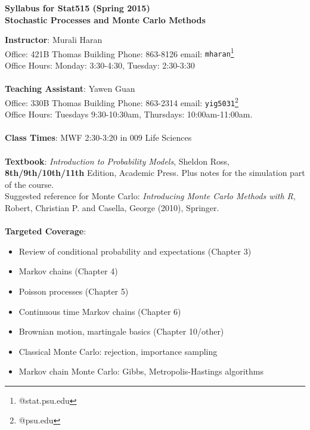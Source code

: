 \documentclass[11pt]{article}
\begin{document}
\pagestyle{empty}
\vspace{-0.5in}
\Large
\begin{center}
{\bf  Syllabus for Stat515 (Spring 2015)}\\
{\bf  Stochastic Processes and Monte Carlo Methods}\\
\end{center}
\normalsize {\bf Instructor}: Murali Haran\\ Office: 421B Thomas
Building \:Phone: 863-8126 \: email: {\tt mharan}\footnote{@stat.psu.edu}\\ Office
Hours: Monday: 3:30-4:30, Tuesday: 2:30-3:30\\\\ 
{\bf Teaching Assistant}: Yawen Guan \\ Office: 330B Thomas Building \:Phone: 863-2314
\: email: {\tt yig5031}\footnote{@psu.edu}\\  Office
Hours: Tuesdays 9:30-10:30am, Thursdays: 10:00am-11:00am.\\\\ %
{\bf Class Times}: MWF 2:30-3:20 in 009 Life Sciences\\\\
{\bf Textbook}: {\it Introduction to Probability Models}, Sheldon
Ross, {\bf 8th/9th/10th/11th} Edition, Academic Press. Plus notes for
the simulation part of the course. \\Suggested reference for Monte Carlo: {\it Introducing Monte Carlo Methods with R}, Robert, Christian P. and Casella, George (2010), Springer.\\\\
{\bf Targeted Coverage}:
\begin{itemize}
\item Review of conditional probability and expectations (Chapter 3)
\item Markov chains (Chapter 4)
\item Poisson processes (Chapter 5)
\item Continuous time Markov chains (Chapter 6) 
\item Brownian motion, martingale basics (Chapter 10/other) 
\item Classical Monte Carlo: rejection, importance sampling
\item Markov chain Monte Carlo: Gibbs, Metropolis-Hastings algorithms
\end{itemize}
\end{document}
